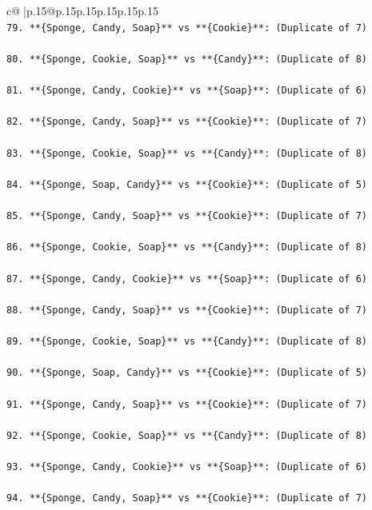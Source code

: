 \documentclass{article}
\begin{document}
{\begin{supertabular}{c@{$\;$}|p{.15\linewidth}@{}p{.15\linewidth}p{.15\linewidth}p{.15\linewidth}p{.15\linewidth}p{.15\linewidth}}
{{{\\ 
\texttt{79. **\{Sponge, Candy, Soap\}** vs **\{Cookie\}**: (Duplicate of 7)} \\
\\ 
\texttt{80. **\{Sponge, Cookie, Soap\}** vs **\{Candy\}**: (Duplicate of 8)} \\
\\ 
\texttt{81. **\{Sponge, Candy, Cookie\}** vs **\{Soap\}**: (Duplicate of 6)} \\
\\ 
\texttt{82. **\{Sponge, Candy, Soap\}** vs **\{Cookie\}**: (Duplicate of 7)} \\
\\ 
\texttt{83. **\{Sponge, Cookie, Soap\}** vs **\{Candy\}**: (Duplicate of 8)} \\
\\ 
\texttt{84. **\{Sponge, Soap, Candy\}** vs **\{Cookie\}**: (Duplicate of 5)} \\
\\ 
\texttt{85. **\{Sponge, Candy, Soap\}** vs **\{Cookie\}**: (Duplicate of 7)} \\
\\ 
\texttt{86. **\{Sponge, Cookie, Soap\}** vs **\{Candy\}**: (Duplicate of 8)} \\
\\ 
\texttt{87. **\{Sponge, Candy, Cookie\}** vs **\{Soap\}**: (Duplicate of 6)} \\
\\ 
\texttt{88. **\{Sponge, Candy, Soap\}** vs **\{Cookie\}**: (Duplicate of 7)} \\
\\ 
\texttt{89. **\{Sponge, Cookie, Soap\}** vs **\{Candy\}**: (Duplicate of 8)} \\
\\ 
\texttt{90. **\{Sponge, Soap, Candy\}** vs **\{Cookie\}**: (Duplicate of 5)} \\
\\ 
\texttt{91. **\{Sponge, Candy, Soap\}** vs **\{Cookie\}**: (Duplicate of 7)} \\
\\ 
\texttt{92. **\{Sponge, Cookie, Soap\}** vs **\{Candy\}**: (Duplicate of 8)} \\
\\ 
\texttt{93. **\{Sponge, Candy, Cookie\}** vs **\{Soap\}**: (Duplicate of 6)} \\
\\ 
\texttt{94. **\{Sponge, Candy, Soap\}** vs **\{Cookie\}**: (Duplicate of 7)} \\
}}}
\end{supertabular}}
\end{document}
